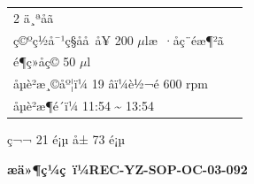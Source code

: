 \documentclass[UTF8,10pt,a4paper,fontset=fandol]{ctexart}
\newcommand{\fieldvalue}[1]{#1}
\newcommand{\handwritten}[1]{#1}
\begin{document}
\begin{center}
\begin{center}
\begin{tabularx}{\textwidth}{|p{}|X|}
\fieldvalue{\handwritten{2}}
ä¸ªå­ã\\
ç©ºç½å¯¹ç§å­å å¥
\fieldvalue{\handwritten{200}}
$\mu$læ ·åç¨éæ¶²ã\\
é¶ç»åç©
\fieldvalue{\handwritten{50}}
$\mu$l\\
å­µè²æ¸©åº¦ï¼
\fieldvalue{\handwritten{19}}
âï¼è½¬é
\fieldvalue{\handwritten{600}}
rpm\\
å­µè²æ¶é´ï¼
\fieldvalue{\handwritten{11:54}}
\quad\textasciitilde\quad
\fieldvalue{\handwritten{13:54}}\\
\hline
\end{tabularx}

\vfill
\begin{center}
ç¬¬ 21 é¡µ å± 73 é¡µ
\end{center}

\newpage

\begin{center}
\textbf{æä»¶ç¼ç ï¼REC-YZ-SOP-OC-03-092}
\end{center}


\end{center}
\end{center}
\end{document}
